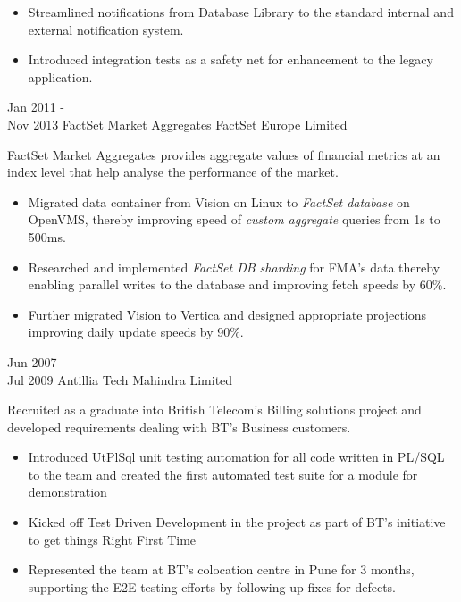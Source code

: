\documentclass[a4paper]{twentysecondcv} %
\begin{document}
\begin{twenty}
{{\begin{itemize}
          \item {Streamlined notifications from Database Library to the standard internal and external notification system.}
          \item {Introduced integration tests as a safety net for enhancement to the legacy application.}
        \end{itemize}}
      }
  \twentyitem
      {Jan 2011 - \\Nov 2013}
      {FactSet Market Aggregates}
      {FactSet Europe Limited}
      {}
      {{FactSet Market Aggregates provides aggregate values of financial metrics at an index level that help analyse the performance of the market.}
        {\begin{itemize}
        \item {Migrated data container from Vision on Linux to \emph{FactSet database} on OpenVMS, thereby improving speed of \emph{custom aggregate} queries from 1s to 500ms.}
        \item {Researched and implemented \emph{FactSet DB sharding} for FMA's data thereby enabling parallel writes to the database and improving fetch speeds by 60\%.}
        \item {Further migrated Vision to Vertica and designed appropriate projections improving daily update speeds by 90\%.}
        \end{itemize}}
      }
  \twentyitem
      {Jun 2007 - \\Jul 2009}
      {Antillia}
      {Tech Mahindra Limited}
      {}
      {{Recruited as a graduate into British Telecom's Billing solutions project and developed requirements dealing  with BT's Business customers.}
        {\begin{itemize}
        \item{Introduced UtPlSql unit testing automation for all code written in PL/SQL to the team and created the first automated test suite for a module for demonstration}
          \item{Kicked off Test Driven Development in the project as part of BT's initiative to get things Right First Time}
          \item {Represented the team at BT's colocation centre in Pune for 3 months, supporting the E2E testing efforts by following up fixes for defects.}
        \end{itemize}}
      }
\end{twenty}
\end{document}
